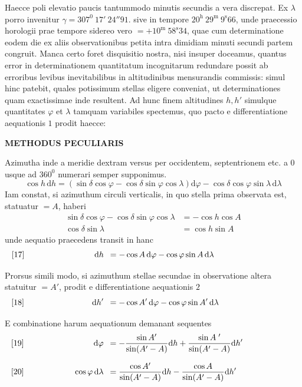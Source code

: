 \noindent Haecce poli elevatio paucis tantummodo minutis secundis a vera discrepat. Ex $\lambda$ porro invenitur $\gamma=307^0\ 17'\ 24''91$. sive in tempore $20^{\mathrm h}\ 29^{\mathrm m}\ 9^{\mathrm s}66$, unde praecessio horologii prae tempore sidereo vero $=+10^{\mathrm m}\ 58^{\mathrm s}34$, quae cum determinatione eodem die ex aliis observationibus petita intra dimidiam minuti secundi partem congruit.
Manca certo foret disquisitio nostra, nisi insuper doceamus, quantus error in determinationem quantitatum incognitarum redundare possit ab erroribus levibus inevitabilibus in altitudinibus mensurandis commissis: simul hinc patebit, quales potissimum stellas eligere conveniat, ut determinationes quam exactissimae inde resultent. Ad hunc finem altitudines $h,h'$ simulque quantitates $\varphi$ et $\lambda$ tamquam variabiles spectemus, quo pacto e differentiatione aequationis $1$ prodit haecce:
\par\clearpage
\noindent{}%
%
\parbox[t]{\dimexpr\linewidth-24mm\relax}{\centering\fontsize{7.4}{9.2}\selectfont\bfseries METHODUS PECULIARIS\par}%
\makebox[12mm][r]{}\par\nobreak\smallskip
\expandafter\def\csname HistoricalNoteText1\endcsname{%
  \fontsize{8.2}{10}\selectfont
  Azimutha inde a meridie dextram versus per occidentem, septentrionem etc. a $0$ usque ad $360^0$\newline
  numerari semper supponimus.}
\newcommand{\GaussVIPoliEquation}[3]{%
  \[
  \makebox[\linewidth][l]{%
    \makebox[0pt][l]{[#1]}%
    \makebox[.325\linewidth][r]{$\displaystyle #2$}\enspace
    $\displaystyle {}=#3$}%
  \]%
}
\[
\cos h\,\mathrm dh=(\sin\delta\cos\varphi-\cos\delta\sin\varphi\cos\lambda)\mathrm d\varphi-\cos\delta\cos\varphi\sin\lambda\,\mathrm d\lambda
\]
Iam constat, si azimuthum circuli verticalis, in quo stella prima observata est, statuatur $=A$, haberi
\[
\begin{aligned}
\sin\delta\cos\varphi-\cos\delta\sin\varphi\cos\lambda&=-\cos h\cos A\\
\cos\delta\sin\lambda&=\cos h\sin A
\end{aligned}
\]
unde aequatio praecedens transit in hanc
\GaussVIPoliEquation{17}{\mathrm dh}{-\cos A\,\mathrm d\varphi-\cos\varphi\sin A\,\mathrm d\lambda}
Prorsus simili modo, si azimuthum stellae secundae in observatione altera statuitur $=A'$, prodit e differentiatione aequationis $2$
\GaussVIPoliEquation{18}{\mathrm dh'}{-\cos A'\,\mathrm d\varphi-\cos\varphi\sin A'\,\mathrm d\lambda}
E combinatione harum aequationum demanant sequentes
\GaussVIPoliEquation{19}{\mathrm d\varphi}{-\frac{\sin A'}{\sin(A'-A)}\mathrm dh+\frac{\sin A\;{}'}{\sin(A'-A)}\mathrm dh'}
\GaussVIPoliEquation{20}{\cos\varphi\,\mathrm d\lambda}{\frac{\cos A'}{\sin(A'-A)}\mathrm dh-\frac{\cos A}{\sin(A'-A)}\mathrm dh'}


